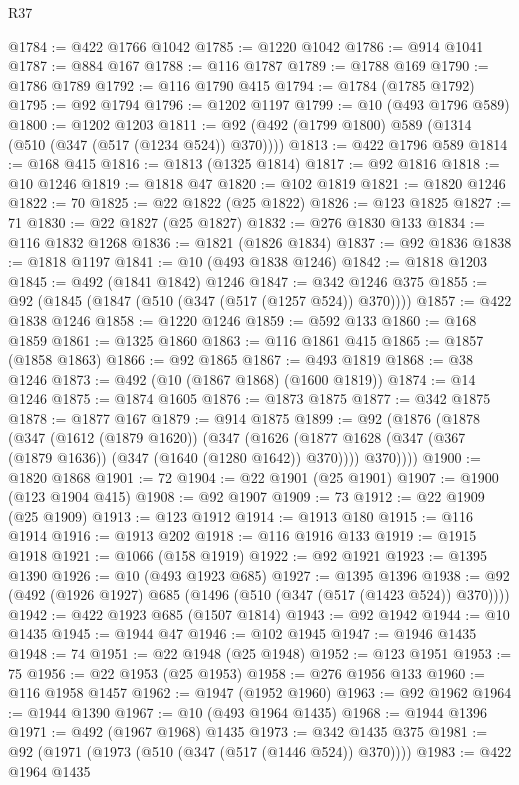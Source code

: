\begin{lexlean}{R37}
\begin{coremodule}
@1784 := @422 @1766 @1042
@1785 := @1220 @1042
@1786 := @914 @1041
@1787 := @884 @167
@1788 := @116 @1787
@1789 := @1788 @169
@1790 := @1786 @1789
@1792 := @116 @1790 @415
@1794 := @1784 (@1785 @1792)
@1795 := @92 @1794
@1796 := @1202 @1197
@1799 := @10 (@493 @1796 @589)
@1800 := @1202 @1203
@1811 := @92 (@492 (@1799 @1800) @589 (@1314 (@510 (@347 (@517 (@1234 @524)) @370))))
@1813 := @422 @1796 @589
@1814 := @168 @415
@1816 := @1813 (@1325 @1814)
@1817 := @92 @1816
@1818 := @10 @1246
@1819 := @1818 @47
@1820 := @102 @1819
@1821 := @1820 @1246
@1822 := 70
@1825 := @22 @1822 (@25 @1822)
@1826 := @123 @1825
@1827 := 71
@1830 := @22 @1827 (@25 @1827)
@1832 := @276 @1830 @133
@1834 := @116 @1832 @1268
@1836 := @1821 (@1826 @1834)
@1837 := @92 @1836
@1838 := @1818 @1197
@1841 := @10 (@493 @1838 @1246)
@1842 := @1818 @1203
@1845 := @492 (@1841 @1842) @1246
@1847 := @342 @1246 @375
@1855 := @92 (@1845 (@1847 (@510 (@347 (@517 (@1257 @524)) @370))))
@1857 := @422 @1838 @1246
@1858 := @1220 @1246
@1859 := @592 @133
@1860 := @168 @1859
@1861 := @1325 @1860
@1863 := @116 @1861 @415
@1865 := @1857 (@1858 @1863)
@1866 := @92 @1865
@1867 := @493 @1819
@1868 := @38 @1246
@1873 := @492 (@10 (@1867 @1868) (@1600 @1819))
@1874 := @14 @1246
@1875 := @1874 @1605
@1876 := @1873 @1875
@1877 := @342 @1875
@1878 := @1877 @167
@1879 := @914 @1875
@1899 := @92
    (@1876
      (@1878
        (@347
          (@1612 (@1879 @1620))
          (@347
            (@1626 (@1877 @1628 (@347 (@367 (@1879 @1636)) (@347 (@1640 (@1280 @1642)) @370))))
            @370))))
@1900 := @1820 @1868
@1901 := 72
@1904 := @22 @1901 (@25 @1901)
@1907 := @1900 (@123 @1904 @415)
@1908 := @92 @1907
@1909 := 73
@1912 := @22 @1909 (@25 @1909)
@1913 := @123 @1912
@1914 := @1913 @180
@1915 := @116 @1914
@1916 := @1913 @202
@1918 := @116 @1916 @133
@1919 := @1915 @1918
@1921 := @1066 (@158 @1919)
@1922 := @92 @1921
@1923 := @1395 @1390
@1926 := @10 (@493 @1923 @685)
@1927 := @1395 @1396
@1938 := @92 (@492 (@1926 @1927) @685 (@1496 (@510 (@347 (@517 (@1423 @524)) @370))))
@1942 := @422 @1923 @685 (@1507 @1814)
@1943 := @92 @1942
@1944 := @10 @1435
@1945 := @1944 @47
@1946 := @102 @1945
@1947 := @1946 @1435
@1948 := 74
@1951 := @22 @1948 (@25 @1948)
@1952 := @123 @1951
@1953 := 75
@1956 := @22 @1953 (@25 @1953)
@1958 := @276 @1956 @133
@1960 := @116 @1958 @1457
@1962 := @1947 (@1952 @1960)
@1963 := @92 @1962
@1964 := @1944 @1390
@1967 := @10 (@493 @1964 @1435)
@1968 := @1944 @1396
@1971 := @492 (@1967 @1968) @1435
@1973 := @342 @1435 @375
@1981 := @92 (@1971 (@1973 (@510 (@347 (@517 (@1446 @524)) @370))))
@1983 := @422 @1964 @1435

\end{coremodule}
\end{lexlean}
